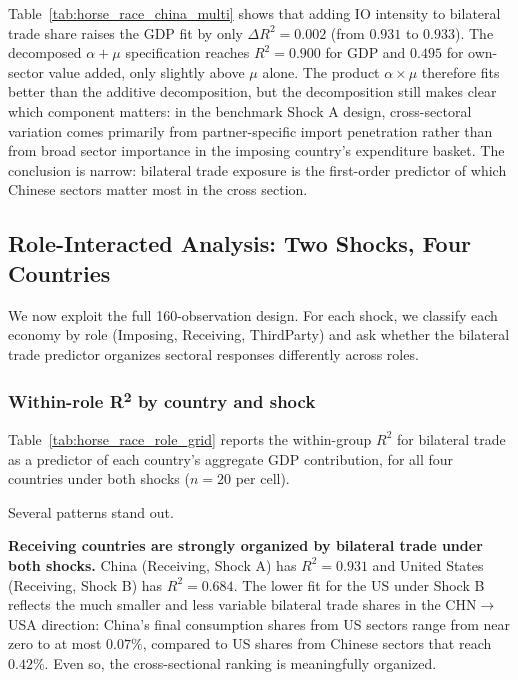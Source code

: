 

Table~\ref{tab:horse_race_china_multi} shows that adding IO intensity to bilateral trade share raises the GDP fit by only $\Delta R^2 = 0.002$ (from $0.931$ to $0.933$). The decomposed $\alpha + \mu$ specification reaches $R^2 = 0.900$ for GDP and $0.495$ for own-sector value added, only slightly above $\mu$ alone. The product $\alpha \times \mu$ therefore fits better than the additive decomposition, but the decomposition still makes clear which component matters: in the benchmark Shock A design, cross-sectoral variation comes primarily from partner-specific import penetration rather than from broad sector importance in the imposing country's expenditure basket. The conclusion is narrow: bilateral trade exposure is the first-order predictor of which Chinese sectors matter most in the cross section.



\subsection{Role-Interacted Analysis: Two Shocks, Four Countries}\label{subsec:horse_race_role}

We now exploit the full 160-observation design. For each shock, we classify each economy by role (Imposing, Receiving, ThirdParty) and ask whether the bilateral trade predictor organizes sectoral responses differently across roles.

\subsubsection*{Within-role R\textsuperscript{2} by country and shock}

Table~\ref{tab:horse_race_role_grid} reports the within-group $R^2$ for bilateral trade as a predictor of each country's aggregate GDP contribution, for all four countries under both shocks ($n=20$ per cell).



Several patterns stand out.

\textbf{Receiving countries are strongly organized by bilateral trade under both shocks.} China (Receiving, Shock A) has $R^2 = 0.931$ and United States (Receiving, Shock B) has $R^2 = 0.684$. The lower fit for the US under Shock B reflects the much smaller and less variable bilateral trade shares in the CHN$\to$USA direction: China's final consumption shares from US sectors range from near zero to at most $0.07\%$, compared to US shares from Chinese sectors that reach $0.42\%$. Even so, the cross-sectional ranking is meaningfully organized.


